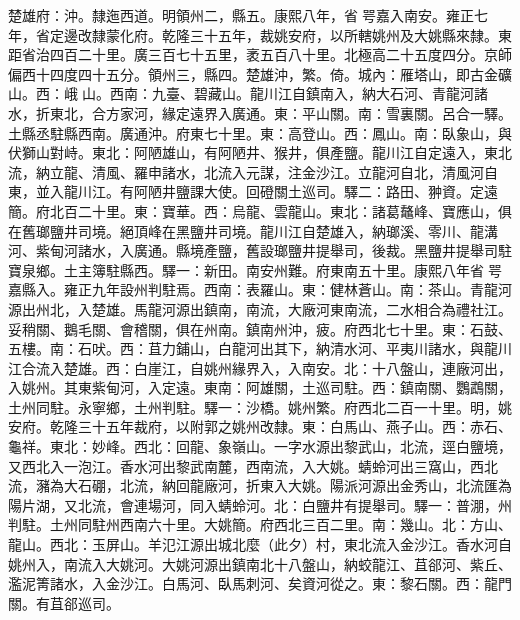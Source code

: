 \begin{pinyinscope}
楚雄府：沖。隸迤西道。明領州二，縣五。康熙八年，省咢嘉入南安。雍正七年，省定邊改隸蒙化府。乾隆三十五年，裁姚安府，以所轄姚州及大姚縣來隸。東距省治四百二十里。廣三百七十五里，袤五百八十里。北極高二十五度四分。京師偏西十四度四十五分。領州三，縣四。楚雄沖，繁。倚。城內：雁塔山，即古金礦山。西：峨𡸮山。西南：九臺、碧藏山。龍川江自鎮南入，納大石河、青龍河諸水，折東北，合方家河，緣定遠界入廣通。東：平山關。南：雪裏關。呂合一驛。土縣丞駐縣西南。廣通沖。府東七十里。東：高登山。西：鳳山。南：臥象山，與伏獅山對峙。東北：阿陋雄山，有阿陋井、猴井，俱產鹽。龍川江自定遠入，東北流，納立龍、清風、羅申諸水，北流入元謀，注金沙江。立龍河自北，清風河自東，並入龍川江。有阿陋井鹽課大使。回磴關土巡司。驛二：路田、翀資。定遠簡。府北百二十里。東：寶華。西：烏龍、雲龍山。東北：諸葛鼇峰、寶應山，俱在舊瑯鹽井司境。絕頂峰在黑鹽井司境。龍川江自楚雄入，納瑯溪、零川、龍溝河、紫甸河諸水，入廣通。縣境產鹽，舊設瑯鹽井提舉司，後裁。黑鹽井提舉司駐寶泉鄉。土主簿駐縣西。驛一：新田。南安州難。府東南五十里。康熙八年省咢嘉縣入。雍正九年設州判駐焉。西南：表羅山。東：健林蒼山。南：茶山。青龍河源出州北，入楚雄。馬龍河源出鎮南，南流，大廠河東南流，二水相合為禮社江。妥稍關、鵝毛關、會稽關，俱在州南。鎮南州沖，疲。府西北七十里。東：石鼓、五樓。南：石吠。西：苴力鋪山，白龍河出其下，納清水河、平夷川諸水，與龍川江合流入楚雄。西：白崖江，自姚州緣界入，入南安。北：十八盤山，連廠河出，入姚州。其東紫甸河，入定遠。東南：阿雄關，土巡司駐。西：鎮南關、鸚鵡關，土州同駐。永寧鄉，土州判駐。驛一：沙橋。姚州繁。府西北二百一十里。明，姚安府。乾隆三十五年裁府，以附郭之姚州改隸。東：白馬山、燕子山。西：赤石、龜祥。東北：妙峰。西北：回龍、象嶺山。一字水源出黎武山，北流，逕白鹽境，又西北入一泡江。香水河出黎武南麓，西南流，入大姚。蜻蛉河出三窩山，西北流，瀦為大石硼，北流，納回龍廠河，折東入大姚。陽派河源出金秀山，北流匯為陽片湖，又北流，會連場河，同入蜻蛉河。北：白鹽井有提舉司。驛一：普淜，州判駐。土州同駐州西南六十里。大姚簡。府西北三百二里。南：幾山。北：方山、龍山。西北：玉屏山。羊氾江源出城北麼（此夕）村，東北流入金沙江。香水河自姚州入，南流入大姚河。大姚河源出鎮南北十八盤山，納蛟龍江、苴郤河、紫丘、濫泥箐諸水，入金沙江。白馬河、臥馬刺河、矣資河從之。東：黎石關。西：龍門關。有苴郤巡司。


\end{pinyinscope}
